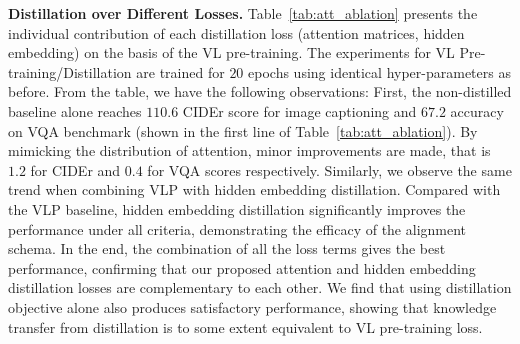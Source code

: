 \noindent \textbf{Distillation over Different Losses.} Table~\ref{tab:att_ablation} presents the individual contribution of each distillation loss (attention matrices, hidden embedding) on the basis of the VL pre-training. The experiments for VL Pre-training/Distillation are trained for $20$ epochs using identical hyper-parameters as before. 
From the table, we have the following observations: First, the non-distilled baseline alone reaches $110.6$ CIDEr score for image captioning and $67.2$ accuracy on VQA benchmark (shown in the first line of Table~\ref{tab:att_ablation}). By mimicking the distribution of attention, minor improvements are made, that is $1.2$ for CIDEr and $0.4$ for VQA scores respectively. Similarly, we observe the same trend when combining VLP with hidden embedding distillation. Compared with the VLP baseline, hidden embedding distillation significantly improves the performance under all criteria, demonstrating the efficacy of the alignment schema. In the end, the combination of all the loss terms gives the best performance, confirming that our proposed attention and hidden embedding distillation losses are complementary to each other. We find that using distillation objective alone also produces satisfactory performance, showing that knowledge transfer from distillation is to some extent equivalent to VL pre-training loss.


